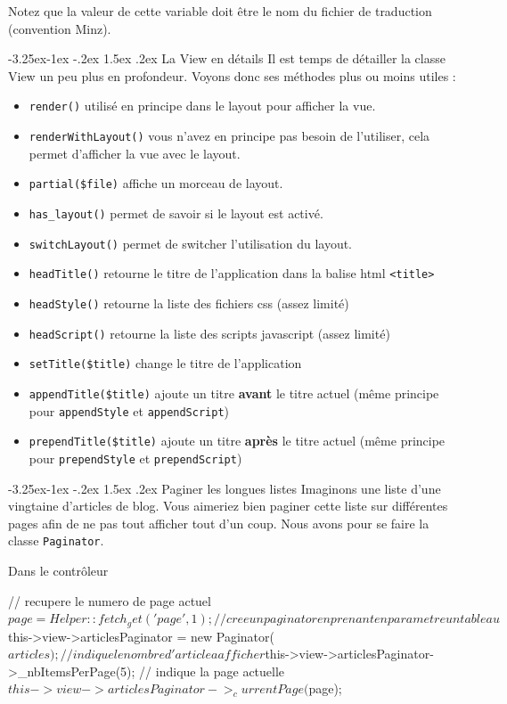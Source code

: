 \documentclass[a4paper,11pt]{article}
\makeatletter
\renewcommand{\subsection}{\@startsection{subsection}{2}{\z@}%
             {-3.25ex\@plus -1ex \@minus -.2ex}%
             {1.5ex \@plus .2ex}%
             {\color{bleuFonce}\normalfont\large\bfseries}}
\makeatother
\begin{document}
Notez que la valeur de cette variable doit être le nom du fichier de traduction (convention Minz).

\subsection{La View en détails}
Il est temps de détailler la classe View un peu plus en profondeur. Voyons donc ses méthodes plus ou moins utiles :
\begin{itemize}
  \item \texttt{render()} utilisé en principe dans le layout pour afficher la vue.
  \item \texttt{renderWithLayout()} vous n'avez en principe pas besoin de l'utiliser, cela permet d'afficher la vue avec le layout.
  \item \texttt{partial(\$file)} affiche un morceau de layout.
  \item \texttt{has\_layout()} permet de savoir si le layout est activé.
  \item \texttt{switchLayout()} permet de switcher l'utilisation du layout.
  \item \texttt{headTitle()} retourne le titre de l'application dans la balise html \texttt{<title>}
  \item \texttt{headStyle()} retourne la liste des fichiers css (assez limité)
  \item \texttt{headScript()} retourne la liste des scripts javascript (assez limité)
  \item \texttt{setTitle(\$title)} change le titre de l'application
  \item \texttt{appendTitle(\$title)} ajoute un titre \textbf{avant} le titre actuel (même principe pour \texttt{appendStyle} et \texttt{appendScript})
  \item \texttt{prependTitle(\$title)} ajoute un titre \textbf{après} le titre actuel (même principe pour \texttt{prependStyle} et \texttt{prependScript})
\end{itemize}

\subsection{Paginer les longues listes}
Imaginons une liste d'une vingtaine d'articles de blog. Vous aimeriez bien paginer cette liste sur différentes pages afin de ne pas tout afficher tout d'un coup. Nous avons pour se faire la classe \texttt{Paginator}.

Dans le contrôleur
\begin{PHP}
// recupere le numero de page actuel
$page = Helper::fetch_get('page', 1);
// cree un paginator en prenant en parametre un tableau
$this->view->articlesPaginator = new Paginator($articles);
// indique le nombre d'article a afficher
$this->view->articlesPaginator->_nbItemsPerPage(5);
// indique la page actuelle
$this->view->articlesPaginator->_currentPage($page);
\end{PHP}
\end{document}
